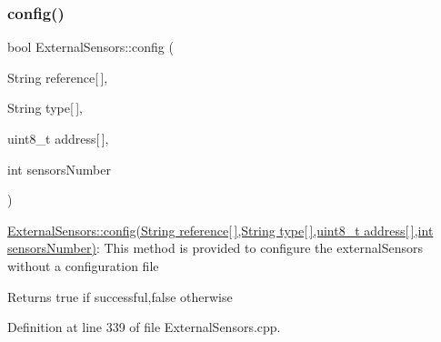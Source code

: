\subsubsection{\texorpdfstring{config()}{config()}\hspace{0.1cm}{\footnotesize\ttfamily [2/2]}}
{\footnotesize\ttfamily bool External\+Sensors\+::config (\begin{DoxyParamCaption}\item[{String}]{reference\mbox{[}$\,$\mbox{]},  }\item[{String}]{type\mbox{[}$\,$\mbox{]},  }\item[{uint8\+\_\+t}]{address\mbox{[}$\,$\mbox{]},  }\item[{int}]{sensors\+Number }\end{DoxyParamCaption})}

\hyperlink{class_external_sensors_ac829858f587e15a3fcb00567248f0edd}{External\+Sensors\+::config(\+String reference\mbox{[}$\,$\mbox{]},\+String type\mbox{[}$\,$\mbox{]},uint8\+\_\+t address\mbox{[}$\,$\mbox{]},int sensors\+Number)}\+: This method is provided to configure the external\+Sensors without a configuration file

\begin{DoxyReturn}{Returns}
true if successful,false otherwise 
\end{DoxyReturn}


Definition at line 339 of file External\+Sensors.\+cpp.


